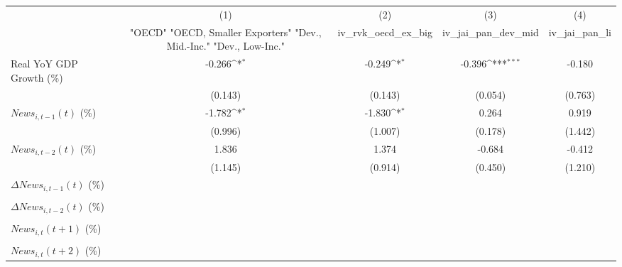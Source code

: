{
\def\sym#1{\ifmmode^{#1}\else\(^{#1}\)\fi}
\begin{tabular}{l*{4}{c}}
\toprule
                    &\multicolumn{1}{c}{(1)}&\multicolumn{1}{c}{(2)}&\multicolumn{1}{c}{(3)}&\multicolumn{1}{c}{(4)}\\
                    &\multicolumn{1}{c}{ "OECD" "OECD, Smaller Exporters" "Dev., Mid.-Inc." "Dev., Low-Inc."}&\multicolumn{1}{c}{iv_rvk_oecd_ex_big}&\multicolumn{1}{c}{iv_jai_pan_dev_mid}&\multicolumn{1}{c}{iv_jai_pan_li}\\
\midrule
Real YoY GDP Growth (\%)&      -0.266\sym{*}  &      -0.249\sym{*}  &      -0.396\sym{***}&      -0.180         \\
                    &     (0.143)         &     (0.143)         &     (0.054)         &     (0.763)         \\
\addlinespace
$ News_{i,t-1}(t)$ (\%)&      -1.782\sym{*}  &      -1.830\sym{*}  &       0.264         &       0.919         \\
                    &     (0.996)         &     (1.007)         &     (0.178)         &     (1.442)         \\
\addlinespace
$ News_{i,t-2}(t)$ (\%)&       1.836         &       1.374         &      -0.684         &      -0.412         \\
                    &     (1.145)         &     (0.914)         &     (0.450)         &     (1.210)         \\
\addlinespace
$ \Delta News_{i,t-1}(t)$ (\%)&                     &                     &                     &                     \\
                    &                     &                     &                     &                     \\
\addlinespace
$ \Delta News_{i,t-2}(t)$ (\%)&                     &                     &                     &                     \\
                    &                     &                     &                     &                     \\
\addlinespace
$ News_{i,t}(t+1)$ (\%)&                     &                     &                     &                     \\
                    &                     &                     &                     &                     \\
\addlinespace
$ News_{i,t}(t+2)$ (\%)&                     &                     &                     &                     \\

\end{tabular}}
